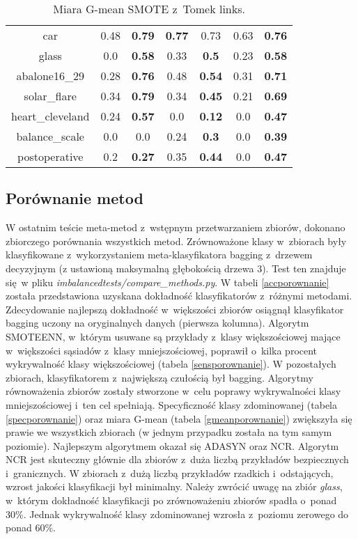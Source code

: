 \begin{table}[H]
\begin{center}
{\begin{tabular}{c|cccccc}
					car&0.48&\textbf{0.79}&\textbf{0.77}&0.73&0.63&\textbf{0.76}\\%
					glass&0.0&\textbf{0.58}&0.33&\textbf{0.5}&0.23&\textbf{0.58}\\%
					abalone16\_29&0.28&\textbf{0.76}&0.48&\textbf{0.54}&0.31&\textbf{0.71}\\%
					solar\_flare&0.34&\textbf{0.79}&0.34&\textbf{0.45}&0.21&\textbf{0.69}\\%
					heart\_cleveland&0.24&\textbf{0.57}&0.0&\textbf{0.12}&0.0&\textbf{0.47}\\%
					balance\_scale&0.0&0.0&0.24&\textbf{0.3}&0.0&\textbf{0.39}\\%
					postoperative&0.2&\textbf{0.27}&0.35&\textbf{0.44}&0.0&\textbf{0.47}\\%
				\end{tabular}}
				\caption{Miara G-mean SMOTE z~Tomek links.}
				\label{gmeansmotetomek}
			\end{center}
		\end{table}		
					
\subsection{Porównanie metod}
W ostatnim teście meta-metod z~wstępnym przetwarzaniem zbiorów, dokonano zbiorczego porównania wszystkich metod. Zrównoważone klasy w~zbiorach były klasyfikowane z~wykorzystaniem meta-klasyfikatora bagging z~drzewem decyzyjnym (z ustawioną maksymalną głębokością drzewa 3). Test ten znajduje się w pliku \textit{imbalancedtests/compare\_methods.py}. W tabeli \ref{accporownanie} została przedstawiona uzyskana dokładność klasyfikatorów z~różnymi metodami. Zdecydowanie najlepszą dokładność w~większości zbiorów osiągnął klasyfikator bagging uczony na oryginalnych danych (pierwsza kolumna). Algorytm SMOTEENN, w~którym usuwane są przykłady z~klasy większościowej mające w~większości sąsiadów z~klasy mniejszościowej, poprawił o~kilka procent wykrywalność klasy większościowej (tabela \ref{sensporownanie}). W pozostałych zbiorach, klasyfikatorem z~największą czułością był bagging. Algorytmy równoważenia zbiorów zostały stworzone w~celu poprawy wykrywalności klasy mniejszościowej i~ten cel spełniają. Specyficzność klasy zdominowanej (tabela \ref{specporownanie}) oraz miara G-mean (tabela \ref{gmeanporownanie}) zwiększyła się prawie we wszystkich zbiorach (w jednym przypadku została na tym samym poziomie). Najlepszym algorytmem okazał się ADASYN oraz NCR. Algorytm NCR jest skuteczny głównie dla zbiorów z~duża liczbą przykładów bezpiecznych i~granicznych. W zbiorach z~dużą liczbą przykładów rzadkich i~odstających, wzrost jakości klasyfikacji był minimalny. Należy zwrócić uwagę na zbiór \textit{glass}, w~którym dokładność klasyfikacji po zrównoważeniu zbiorów spadła o~ponad 30\%. Jednak wykrywalność klasy zdominowanej wzrosła z~poziomu zerowego do ponad 60\%. 

